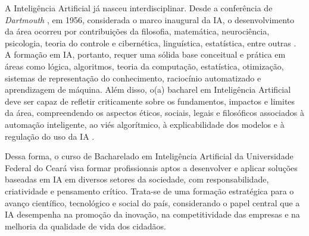 A Inteligência Artificial já nasceu interdisciplinar. Desde a conferência de \textit{Dartmouth} \cite{mccarthy2006proposal}, em 1956, considerada o marco inaugural da IA, o desenvolvimento da área ocorreu por contribuições da filosofia, matemática, neurociência, psicologia, teoria do controle e cibernética, linguística, estatística, entre outras \cite{russell2022ia}.  A formação em IA, portanto, requer uma sólida base conceitual e prática em áreas como lógica, algoritmos, teoria da computação, estatística, otimização, sistemas de representação do conhecimento, raciocínio automatizado e aprendizagem de máquina. %
Além disso, o(a) bacharel em Inteligência Artificial deve ser capaz de refletir criticamente sobre os fundamentos, impactos e limites da área, compreendendo os aspectos éticos, sociais, legais e filosóficos associados à automação inteligente, ao viés algorítmico, à explicabilidade dos modelos e à regulação do uso da IA \cite{floridi2018ai4people,mittelstadt2016ethics, eu_ai_act_2021}.







Dessa forma, o curso de Bacharelado em Inteligência Artificial da Universidade Federal do Ceará visa formar profissionais aptos a desenvolver e aplicar soluções baseadas em IA em diversos setores da sociedade, com responsabilidade, criatividade e pensamento crítico. Trata-se de uma formação estratégica para o avanço científico, tecnológico e social do país, considerando o papel central que a IA desempenha na promoção da inovação, na competitividade das empresas e na melhoria da qualidade de vida dos cidadãos.

